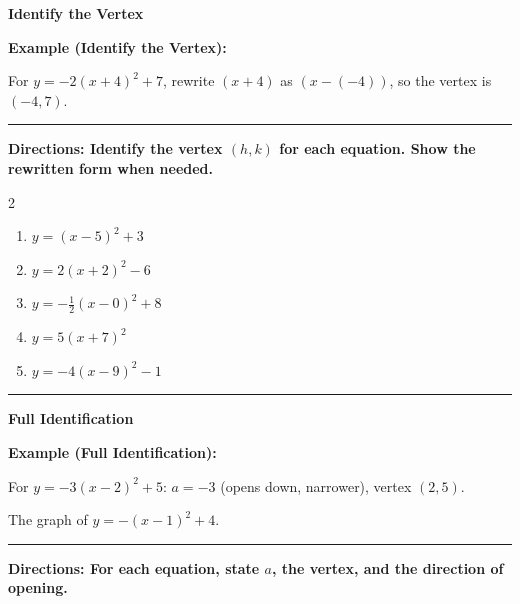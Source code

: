 \documentclass[12pt]{article}
\begin{document}
\begin{center}{\Large \textbf{Identify the Vertex}}\end{center}\vspace{0.2cm}
\textbf{Example (Identify the Vertex):}

For $y=-2(x+4)^2+7$, rewrite $(x+4)$ as $(x-(-4))$, so the vertex is $(-4,7)$.

\vspace{0.2cm}\hrule\vspace{0.35cm}
\textbf{Directions: Identify the vertex $(h,k)$ for each equation. Show the rewritten form when needed.}

\begin{multicols}{2}
\begin{enumerate}[label=\textbf{\arabic*.}, start=5, itemsep=2cm]
  \item $\displaystyle y=(x-5)^2+3$
  \item $\displaystyle y=2(x+2)^2-6$
  \item $\displaystyle y=-\frac{1}{2}(x-0)^2+8$
  \item $\displaystyle y=5(x+7)^2$
  \item $\displaystyle y=-4(x-9)^2-1$
\end{enumerate}
\end{multicols}
\vspace{0.25cm}\hrule\vspace{0.35cm}

\begin{center}{\Large \textbf{Full Identification}}\end{center}\vspace{0.2cm}
\textbf{Example (Full Identification):}

For $y=-3(x-2)^2+5$: $a=-3$ (opens down, narrower), vertex $(2,5)$.

\begin{center}\end{center}
{\small\centering The graph of $y=-(x-1)^2+4$.\par}
\vspace{0.2cm}\hrule\vspace{0.35cm}
\textbf{Directions: For each equation, state $a$, the vertex, and the direction of opening.}
\end{document}
